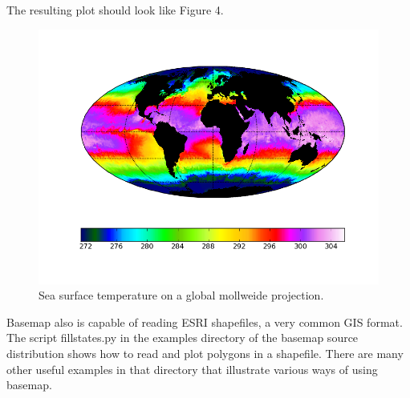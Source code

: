 

The resulting plot should look like Figure 4.

\begin{figure}[h]
\includegraphics[scale=0.75]{fig/basemap5}

\caption{Sea surface temperature on a global mollweide projection.}

\end{figure}

\medskip{}

Basemap also is capable of reading ESRI shapefiles, a very common
GIS format. The script fillstates.py in the examples directory of
the basemap source distribution shows how to read and plot polygons
in a shapefile. There are many other useful examples in that directory
that illustrate various ways of using basemap.%
